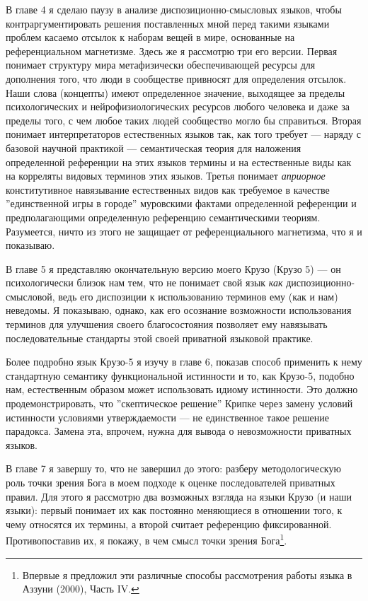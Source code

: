 \documentclass[12pt]{book}
\begin{document}
В главе 4 я сделаю паузу в анализе диспозиционно-смысловых языков, чтобы контраргументировать решения поставленных мной перед такими языками проблем касаемо отсылок к наборам вещей в мире, основанные на референциальном магнетизме. Здесь же я рассмотрю три его версии. Первая понимает структуру мира метафизически обеспечивающей ресурсы для дополнения того, что люди в сообществе привносят для определения отсылок. Наши слова (концепты) имеют определенное значение, выходящее за пределы психологических и нейрофизиологических ресурсов любого человека и даже за пределы того, с чем любое таких людей сообщество могло бы справиться. Вторая понимает интерпретаторов естественных языков так, как того требует --- наряду с базовой научной практикой --- семантическая теория для наложения определенной референции на этих языков термины и на естественные виды как на корреляты видовых терминов этих языков. Третья понимает \textit{априорное} конститутивное навязывание естественных видов как требуемое в качестве ''единственной игры в городе'' муровскими фактами определенной референции и предполагающими определенную референцию семантическими теориям. Разумеется, ничто из этого не защищает от референциального магнетизма, что я и показываю.

В главе 5 я представляю окончательную версию моего Крузо (Крузо 5) --- он психологически близок нам тем, что не понимает свой язык \textit{как} диспозиционно-смысловой, ведь его диспозиции к использованию терминов ему (как и нам) неведомы. Я показываю, однако, как его осознание возможности использования терминов для улучшения своего благосостояния позволяет ему навязывать последовательные стандарты этой своей приватной языковой практике.

Более подробно язык Крузо-5 я изучу в главе 6, показав способ применить к нему стандартную семантику функциональной истинности и то, как Крузо-5, подобно нам, естественным образом может использовать идиому истинности. Это должно продемонстрировать, что ''скептическое решение'' Крипке через замену условий истинности условиями утверждаемости --- не единственное такое решение парадокса. Замена эта, впрочем, нужна для вывода о невозможности приватных языков.

В главе 7 я завершу то, что не завершил до этого: разберу методологическую роль точки зрения Бога в моем подходе к оценке последователей приватных правил. Для этого я рассмотрю два возможных взгляда на языки Крузо (и наши языки): первый понимает их как постоянно меняющиеся в отношении того, к чему относятся их термины, а второй считает референцию фиксированной. Противопоставив их, я покажу, в чем смысл точки зрения Бога\footnote{Впервые я предложил эти различные способы рассмотрения работы языка в Аззуни (2000), Часть IV.}.
\end{document}
